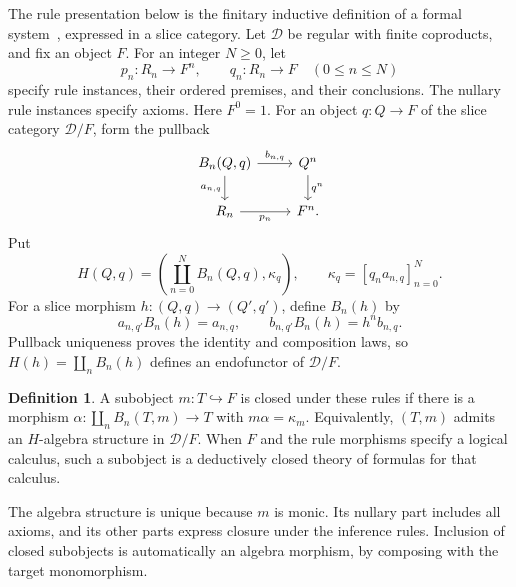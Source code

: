 \documentclass[11pt]{article}
\theoremstyle{definition}\newtheorem{definition}[theorem]{Definition}
\begin{document}
The rule presentation below is the finitary inductive definition of a
formal system~\cite[Section 1.1]{Aczel}, expressed in a slice category.
Let $\mathcal D$ be regular with finite coproducts, and fix an object
$F$. For an integer $N\geq0$, let
\[
 p_n:R_n\longrightarrow F^n,\qquad
 q_n:R_n\longrightarrow F\quad(0\leq n\leq N)
\]
specify rule instances, their ordered premises, and their conclusions.
The nullary rule instances specify axioms. Here $F^0=1$.
For an object $q:Q\to F$ of the slice category $\mathcal D/F$,
form the pullback
\[
\begin{tikzcd}
 B_n(Q,q)\arrow[r,"{b_{n,q}}"]\arrow[d,"{a_{n,q}}"'] &
 Q^n\arrow[d,"q^n"]\\
 R_n\arrow[r,"p_n"'] & F^n.
\end{tikzcd}
\]
Put
\[
 H(Q,q)=\left(\coprod_{n=0}^N B_n(Q,q),\kappa_q\right),\qquad
 \kappa_q=[q_na_{n,q}]_{n=0}^N.
\]
For a slice morphism $h:(Q,q)\to(Q',q')$, define $B_n(h)$ by
\[
 a_{n,q'}B_n(h)=a_{n,q},\qquad
 b_{n,q'}B_n(h)=h^n b_{n,q}.
\]
Pullback uniqueness proves the identity and composition laws, so
$H(h)=\coprod_nB_n(h)$ defines an endofunctor of $\mathcal D/F$.

\begin{definition}\label{def:deductively-closed}
A subobject $m:T\hookrightarrow F$ is closed under these rules if
there is a morphism $\alpha:\coprod_nB_n(T,m)\to T$ with
$m\alpha=\kappa_m$. Equivalently, $(T,m)$ admits an $H$-algebra
structure in $\mathcal D/F$. When $F$ and the rule morphisms specify
a logical calculus, such a subobject is a deductively closed theory
of formulas for that calculus.
\end{definition}

The algebra structure is unique because $m$ is monic. Its nullary
part includes all axioms, and its other parts express closure under
the inference rules. Inclusion of closed subobjects is automatically
an algebra morphism, by composing with the target monomorphism.
\end{document}
